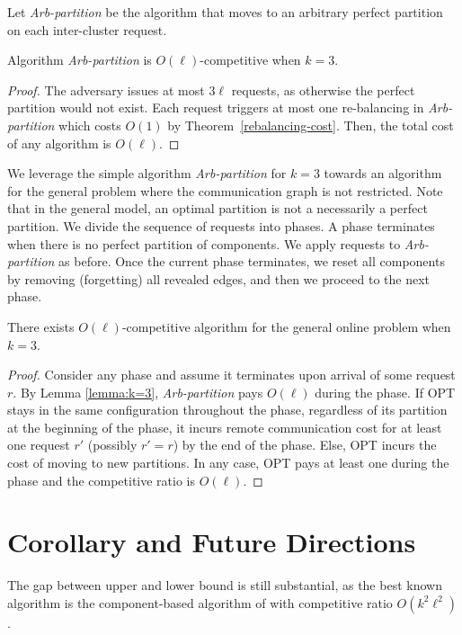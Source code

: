 \documentclass[manuscript,screen=true]{acmart}
\begin{document}
   Let \emph{Arb-partition} be the algorithm that moves to an arbitrary perfect partition
on each inter-cluster request.
\begin{theorem}
	Algorithm \emph{Arb-partition} is $O(\ell)$-competitive when $k=3$.
\end{theorem}

\begin{proof}
	The adversary issues at most $3\ell$ requests, as otherwise the perfect partition would not exist.
	Each request triggers at most one re-balancing in \emph{Arb-partition}
	which costs $O(1)$ by Theorem~\ref{rebalancing-cost}.
	Then,
	the total cost of any algorithm is $O(\ell)$.
\end{proof}

We leverage the simple algorithm \emph{Arb-partition} for $k=3$
towards an algorithm for the general problem
where the communication graph is not restricted.
Note that in the general model,
an optimal partition is not a necessarily a perfect partition.
We divide the sequence of requests into phases.
A phase terminates when there is no perfect partition of components.
We apply requests to \emph{Arb-partition} as before. 
Once the current phase terminates,
we reset all components by removing (forgetting) all revealed edges,
and then we proceed to the next phase.

\begin{theorem} \label{cor:k=3}
	There exists $O(\ell)$-competitive algorithm for the general online problem when $k=3$. 
\end{theorem}
\begin{proof}
	Consider any phase and assume it terminates upon arrival of some request $r$.
	By Lemma  \ref{lemma:k=3},
	\emph{Arb-partition} pays $O(\ell)$ during the phase.
	If OPT stays in the same configuration throughout the phase,
	regardless of its partition at the beginning of the phase,        
	it incurs remote communication cost for at least one request $r'$ (possibly $r'=r$) by the end of the phase.
	Else,
	OPT incurs the cost of moving to new partitions.
	In any case,
	OPT pays at least one during the phase and 
	the competitive ratio is $O(\ell)$.
\end{proof}


\section{Corollary and Future Directions}

The gap between upper and lower bound is still substantial, as the best known algorithm is the component-based algorithm of   \cite{repartition-disc} with competitive ratio $O(k^2\ell^2)$.
\end{document}

